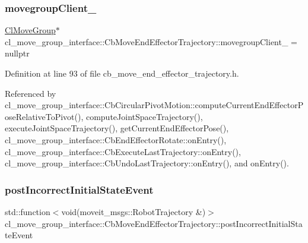 \subsubsection{\texorpdfstring{movegroup\+Client\+\_\+}{movegroupClient\_}}
{\footnotesize\ttfamily \hyperlink{classcl__move__group__interface_1_1ClMoveGroup}{Cl\+Move\+Group}$\ast$ cl\+\_\+move\+\_\+group\+\_\+interface\+::\+Cb\+Move\+End\+Effector\+Trajectory\+::movegroup\+Client\+\_\+ = nullptr\hspace{0.3cm}{\ttfamily [protected]}}



Definition at line 93 of file cb\+\_\+move\+\_\+end\+\_\+effector\+\_\+trajectory.\+h.



Referenced by cl\+\_\+move\+\_\+group\+\_\+interface\+::\+Cb\+Circular\+Pivot\+Motion\+::compute\+Current\+End\+Effector\+Pose\+Relative\+To\+Pivot(), compute\+Joint\+Space\+Trajectory(), execute\+Joint\+Space\+Trajectory(), get\+Current\+End\+Effector\+Pose(), cl\+\_\+move\+\_\+group\+\_\+interface\+::\+Cb\+End\+Effector\+Rotate\+::on\+Entry(), cl\+\_\+move\+\_\+group\+\_\+interface\+::\+Cb\+Execute\+Last\+Trajectory\+::on\+Entry(), cl\+\_\+move\+\_\+group\+\_\+interface\+::\+Cb\+Undo\+Last\+Trajectory\+::on\+Entry(), and on\+Entry().

\mbox{\label{classcl__move__group__interface_1_1CbMoveEndEffectorTrajectory_a6180230347c922fa0d85f514ce5029df}} 
\subsubsection{\texorpdfstring{post\+Incorrect\+Initial\+State\+Event}{postIncorrectInitialStateEvent}}
{\footnotesize\ttfamily std\+::function$<$void(moveit\+\_\+msgs\+::\+Robot\+Trajectory \&)$>$ cl\+\_\+move\+\_\+group\+\_\+interface\+::\+Cb\+Move\+End\+Effector\+Trajectory\+::post\+Incorrect\+Initial\+State\+Event\hspace{0.3cm}{\ttfamily [private]}}



